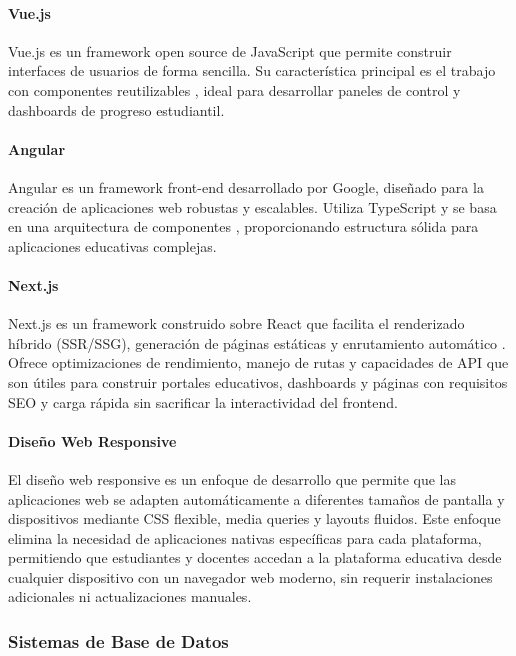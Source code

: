 \paragraph{Vue.js}
Vue.js es un framework open source de JavaScript que permite construir interfaces de usuarios de forma sencilla. Su característica principal es el trabajo con componentes reutilizables \cite{garcia2019}, ideal para desarrollar paneles de control y dashboards de progreso estudiantil.

\paragraph{Angular}
Angular es un framework front-end desarrollado por Google, diseñado para la creación de aplicaciones web robustas y escalables. Utiliza TypeScript y se basa en una arquitectura de componentes \cite{roldan2020}, proporcionando estructura sólida para aplicaciones educativas complejas.

\paragraph{Next.js}
Next.js es un framework construido sobre React que facilita el renderizado híbrido (SSR/SSG), generación de páginas estáticas y enrutamiento automático \cite{nextjs_docs2024}. Ofrece optimizaciones de rendimiento, manejo de rutas y capacidades de API que son útiles para construir portales educativos, dashboards y páginas con requisitos SEO y carga rápida sin sacrificar la interactividad del frontend.

\paragraph{Diseño Web Responsive}
El diseño web responsive es un enfoque de desarrollo que permite que las aplicaciones web se adapten automáticamente a diferentes tamaños de pantalla y dispositivos mediante CSS flexible, media queries y layouts fluidos. Este enfoque elimina la necesidad de aplicaciones nativas específicas para cada plataforma, permitiendo que estudiantes y docentes accedan a la plataforma educativa desde cualquier dispositivo con un navegador web moderno, sin requerir instalaciones adicionales ni actualizaciones manuales.

\subsubsection{Sistemas de Base de Datos}

